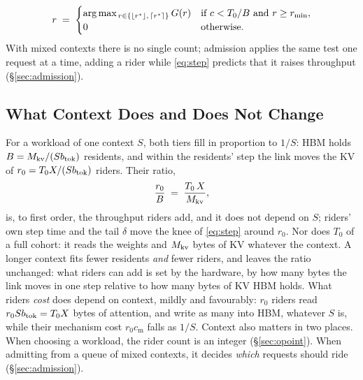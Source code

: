 \begin{equation}
  r \;=\;
  \begin{cases}
    \arg\max_{\,r \in \{\lfloor r^{\star}\rfloor,\, \lceil r^{\star}\rceil\}} G(r)
      & \text{if } c < T_0/B \text{ and } r \ge r_{\min},\\
    0 & \text{otherwise.}
  \end{cases}
  \label{eq:decision}
\end{equation}
With mixed contexts there is no single count; admission applies the same test
one request at a time, adding a rider while \cref{eq:step} predicts that it
raises throughput (\S\ref{sec:admission}).

\subsection{What Context Does and Does Not Change}\label{sec:context}

For a workload of one context $S$, both tiers fill in proportion to $1/S$: HBM
holds $B = M_{\mathrm{kv}}/(Sb_{\mathrm{tok}})$ residents, and within the residents' step the link
moves the KV of $r_0 = T_0X/(Sb_{\mathrm{tok}})$ riders. Their ratio,
\begin{equation}
  \frac{r_0}{B} \;=\; \frac{T_0\,X}{M_{\mathrm{kv}}},
  \label{eq:ratio}
\end{equation}
is, to first order, the throughput riders add, and it does not depend on $S$;
riders' own step time and the tail $\delta$ move the knee of \cref{eq:step}
around $r_0$. Nor does $T_0$ of a
full cohort: it reads the weights and $M_{\mathrm{kv}}$ bytes of KV whatever the context.
A longer context
fits fewer residents \emph{and} fewer riders, and leaves the ratio unchanged:
what riders can add is set by the hardware, by how many bytes the link moves
in one step relative to how many bytes of KV HBM holds. What riders \emph{cost}
does depend on context, mildly and favourably: $r_0$ riders read
$r_0 Sb_{\mathrm{tok}} = T_0X$ bytes of attention, and write as many into HBM,
whatever $S$ is, while their mechanism cost $r_0 c_{\mathrm{m}}$ falls as
$1/S$. Context also matters
in two places. When choosing a workload, the rider count is an integer
(\S\ref{sec:opoint}). When admitting from a queue of mixed contexts, it decides
\emph{which} requests should ride (\S\ref{sec:admission}).

